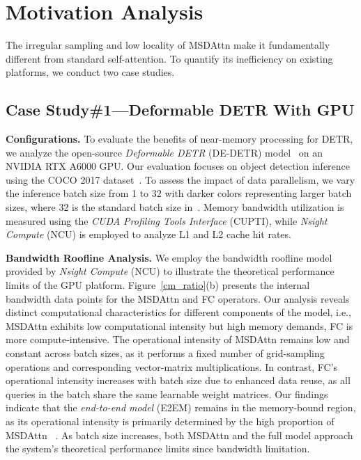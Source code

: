 \documentclass[sigconf]{acmart}
\begin{document}



\section{Motivation Analysis}
\label{motivation_ana}
{ The irregular sampling and low locality of MSDAttn make it fundamentally different from standard self-attention. To quantify its inefficiency on existing platforms, we conduct two case studies.}

\subsection{Case Study\#1---Deformable DETR With GPU}
\textbf{Configurations.} To evaluate the benefits of near-memory processing for DETR, we analyze the open-source \textit{Deformable DETR} (DE-DETR) model~\cite{zhu2021deformable} on an NVIDIA RTX A6000 GPU. Our evaluation focuses on object detection inference using the COCO 2017 dataset~\cite{Lin2014}. To assess the impact of data parallelism, we vary the inference batch size from 1 to 32 with darker colors representing larger batch sizes, where 32 is the standard batch size in~\cite{zhu2021deformable}. Memory bandwidth utilization is measured using the \textit{CUDA Profiling Tools Interface} (CUPTI), while \textit{Nsight Compute} (NCU) is employed to analyze L1 and L2 cache hit rates.


\textbf{Bandwidth Roofline Analysis.} We employ the {bandwidth roofline model} provided by \textit{Nsight Compute} (NCU) to illustrate the theoretical performance limits of the GPU platform. Figure~\ref{cm_ratio}(b) presents the {internal bandwidth} data points for the MSDAttn and FC operators. Our analysis reveals distinct computational characteristics for different components of the model, i.e., MSDAttn exhibits low computational intensity but high memory demands, FC is more compute-intensive. The operational intensity of MSDAttn remains low and constant across batch sizes, as it performs a fixed number of grid-sampling operations and corresponding vector-matrix multiplications. In contrast, FC’s operational intensity increases with batch size due to enhanced data reuse, as all queries in the batch share the same learnable weight matrices. Our findings indicate that the \textit{end-to-end model} (E2EM) remains in the memory-bound region, as its operational intensity is primarily determined by the high proportion of MSDAttn ~\cite{xu2024defa}. As batch size increases, both MSDAttn and the full model approach the system’s theoretical performance limits {since bandwidth limitation}.
\end{document}
